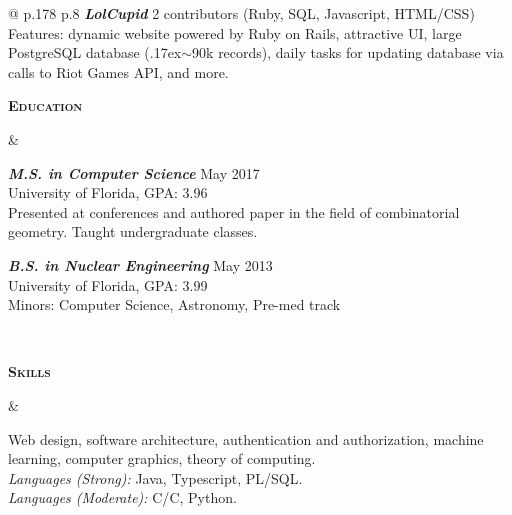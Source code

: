 \documentclass[10pt]{article}
\def\mytilde{{\raise.17ex\hbox{$\scriptstyle\mathtt{\sim}$}}}
\def\cpp{{C\nolinebreak[4]\hspace{-.05em}\raisebox{.4ex}{\tiny\bf ++}}}
\newcommand{\titlecell}[1]{%
  \begin{minipage}[t]{\linewidth}
    \raggedleft \textbf{#1}
\end{minipage}}
\newcommand{\contentcell}[1]{%
  \begin{minipage}[t]{\linewidth}
    #1
\end{minipage}}
\newcommand{\tablerowskip}{\vspace{4.83mm} \\}
\newcommand{\degreeskip}{\vspace{2mm}}
\newcommand{\contentcellheader}[1]{\textbf{\textsl{#1}}}
\begin{document}
\begin{tabular}{@{} p{.178\textwidth} p{.8\textwidth}}
{            \contentcellheader{LolCupid} \hfill 2 contributors (Ruby, SQL, Javascript, HTML/CSS)
            \\ Features: dynamic website powered by Ruby on Rails, attractive UI, large PostgreSQL database (\mytilde 90k records), daily tasks for updating database via calls to Riot Games API, and more.
          }
          \tablerowskip

          \titlecell{\textsc{Education}} &
          \contentcell{
            \contentcellheader{M.S. in Computer Science} \hfill May 2017 \\
            University of Florida, GPA: 3.96 \\
            Presented at conferences and authored paper in the field of combinatorial geometry. Taught undergraduate classes.
            \degreeskip

            \contentcellheader{B.S. in Nuclear Engineering} \hfill May 2013 \\
            University of Florida, GPA: 3.99 \\
            Minors: Computer Science, Astronomy, Pre-med track
          }
          \tablerowskip

          \titlecell{\textsc{Skills}} &
          \contentcell{
            Web design, software architecture, authentication and authorization, machine learning, computer graphics, theory of computing. \\
            {\sl Languages (Strong):} Java, Typescript, PL/SQL. \\
            {\sl Languages (Moderate):} C/\cpp, Python. \\
          }
        \end{tabular}
\end{document}
